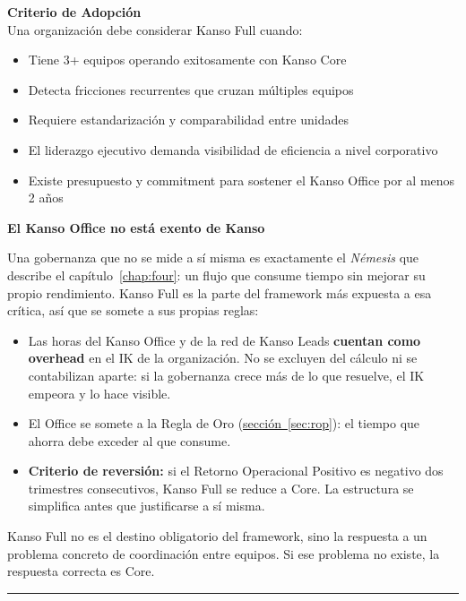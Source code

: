 \textbf{Criterio de Adopción}\\
Una organización debe considerar Kanso Full cuando:
\begin{itemize}
    \item Tiene 3+ equipos operando exitosamente con Kanso Core
    \item Detecta fricciones recurrentes que cruzan múltiples equipos
    \item Requiere estandarización y comparabilidad entre unidades
    \item El liderazgo ejecutivo demanda visibilidad de eficiencia a nivel corporativo
    \item Existe presupuesto y commitment para sostener el Kanso Office por al menos 2 años
\end{itemize}

\textbf{El Kanso Office no está exento de Kanso}

Una gobernanza que no se mide a sí misma es exactamente el \textit{Némesis} que describe el
capítulo~\ref{chap:four}: un flujo que consume tiempo sin mejorar su propio rendimiento. Kanso Full
es la parte del framework más expuesta a esa crítica, así que se somete a sus propias reglas:

\begin{itemize}
    \item Las horas del Kanso Office y de la red de Kanso Leads \textbf{cuentan como overhead} en el
    IK de la organización. No se excluyen del cálculo ni se contabilizan aparte: si la gobernanza
    crece más de lo que resuelve, el IK empeora y lo hace visible.
    \item El Office se somete a la Regla de Oro (\hyperref[sec:rop]{sección~\ref{sec:rop}}): el
    tiempo que ahorra debe exceder al que consume.
    \item \textbf{Criterio de reversión:} si el Retorno Operacional Positivo es negativo dos
    trimestres consecutivos, Kanso Full se reduce a Core. La estructura se simplifica antes que
    justificarse a sí misma.
\end{itemize}

Kanso Full no es el destino obligatorio del framework, sino la respuesta a un problema concreto de
coordinación entre equipos. Si ese problema no existe, la respuesta correcta es Core.

\vspace{1em}

\hrule
